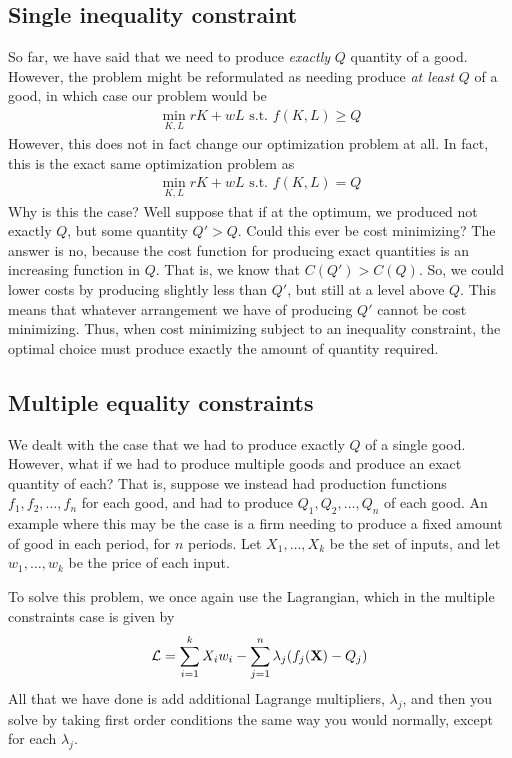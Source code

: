 \subsection*{Single inequality constraint}
So far, we have said that we need to produce \emph{exactly} $Q$ quantity of a good. However, the problem might be reformulated as needing produce \emph{at least} $Q$ of a good, in which case our problem would be
\begin{align*}
    \min_{K, L} rK + wL \text{ s.t. } f(K, L) \geq Q
\end{align*}
However, this does not in fact change our optimization problem at all. In fact, this is the exact same optimization problem as
\begin{align*}
    \min_{K, L} rK + wL \text { s.t. } f(K, L) = Q
\end{align*}
Why is this the case? Well suppose that if at the optimum, we produced not exactly $Q$, but some quantity $Q' > Q$. Could this ever be cost minimizing? The answer is no, because the cost function for producing exact quantities is an increasing function in $Q$. That is, we know that $C(Q') > C(Q)$. So, we could lower costs by producing slightly less than $Q'$, but still at a level above $Q$. This means that whatever arrangement we have of producing $Q'$ cannot be cost minimizing. Thus, when cost minimizing subject to an inequality constraint, the optimal choice must produce exactly the amount of quantity required.

\subsection*{Multiple equality constraints}
We dealt with the case that we had to produce exactly $Q$ of a single good. However, what if we had to produce multiple goods and produce an exact quantity of each? That is, suppose we instead had production functions $f_1, f_2, \dots, f_n$ for each good, and had to produce $Q_1, Q_2, \dots, Q_n$ of each good. An example where this may be the case is a firm needing to produce a fixed amount of good in each period, for $n$ periods. Let $X_1, \dots, X_k$ be the set of inputs, and let $w_1, \dots, w_k$ be the price of each input. 

To solve this problem, we once again use the Lagrangian, which in the multiple constraints case is given by
\begin{align*}
    \mathcal{L} = \sum_{i = 1}^k X_i w_i - \sum_{j = 1}^n \lambda_j(f_j(\mathbf{X}) - Q_j)
\end{align*}
All that we have done is add additional Lagrange multipliers, $\lambda_j$, and then you solve by taking first order conditions the same way you would normally, except for each $\lambda_j$.

